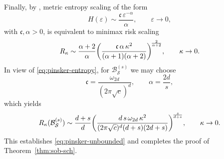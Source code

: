 \documentclass[a4paper,12pt]{article}
\let\originalleft\left
\let\originalright\right
\renewcommand{\left}{\mathopen{}\mathclose\bgroup\originalleft}
\renewcommand{\right}{\aftergroup\egroup\originalright}
\newcommand{\ballsch}{\mathcal{B}^{(s)}_{\mathcal{S}}}
\begin{document}
Finally, by \cite[Appendix~A, Table~(iv)]{allard2025metricentropyminimaxrisk}, metric entropy scaling of the form 
\[
H(\varepsilon)\sim \frac{\mathfrak c\,\varepsilon^{-\alpha}}{\alpha},
\qquad \varepsilon\to0,
\]
with $\mathfrak c,\alpha>0$, is equivalent to minimax risk scaling
\[
R_\kappa
\sim
\frac{\alpha+2}{\alpha}
\left(
\frac{\mathfrak c\,\alpha\,\kappa^2}{(\alpha+1)(\alpha+2)}
\right)^{\!\frac{2}{\alpha+2}},
\qquad \kappa\to0.
\]
In view of \eqref{eq:pinsker-entropy}, for $\ballsch$ we may choose
\[
\mathfrak c=\frac{\omega_{2d}}{(2\pi\sqrt c)^d},
\qquad
\alpha=\frac{2d}{s},
\]
which yields
\[
R_\kappa(\ballsch)
\sim
\frac{d+s}{d}
\left(
\frac{d\,s\,\omega_{2d}\,\kappa^2}
{(2\pi\sqrt c)^d(d+s)(2d+s)}
\right)^{\!\frac{s}{d+s}},
\qquad \kappa\to0.
\]
This establishes \eqref{eq:pinsker-unbounded} and completes the proof of
Theorem~\ref{thm:sob-sch}.





\end{document}
